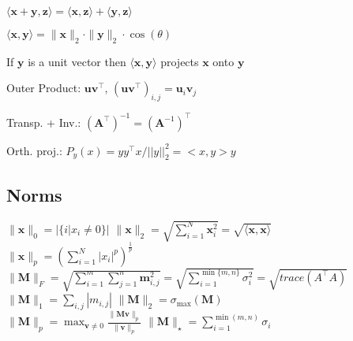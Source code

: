 \begin{compactdesc}
\begin{inparaitem}
		\item $\langle \mathbf{x} + \mathbf{y}, \mathbf{z} \rangle = \langle \mathbf{x}, \mathbf{z} \rangle + \langle \mathbf{y}, \mathbf{z} \rangle$
		\item $\langle \mathbf{x}, \mathbf{y} \rangle = \|\mathbf{x}\|_2 \cdot \|\mathbf{y}\|_2 \cdot \cos(\theta)$
		\item If $\mathbf{y}$ is a unit vector then $\langle \mathbf{x}, \mathbf{y} \rangle$ projects $\mathbf{x}$ onto $\mathbf{y}$
	\end{inparaitem}
	\item[Outer Product:] $\mathbf{u} \mathbf{v}^\top$, $(\mathbf{u} \mathbf{v}^\top)_{i, j} = \mathbf{u}_i \mathbf{v}_j$
	\item[Transp. + Inv.:] $(\mathbf{A}^\top)^{-1} = (\mathbf{A}^{-1})^\top$
	\item[Orth. proj.:] $P_y(x)=y y^\top x / ||y||^2_2 = <x,y>y$
\end{compactdesc}

\subsection*{Norms}
$\|\mathbf{x}\|_0 = |\{i | x_i \neq 0\}|$ \qquad $\|\mathbf{x}\|_2 = \sqrt{\sum_{i=1}^{N} \mathbf{x}_i^2} = \sqrt{\langle \mathbf{x}, \mathbf{x} \rangle}$\\
$\|\mathbf{x}\|_p = \left( \sum_{i=1}^{N} |x_i|^p \right)^{\frac{1}{p}}$\\
$\|\mathbf{M}\|_F =\allowbreak \sqrt{\sum_{i=1}^{m} \sum_{j=1}^{n}\mathbf{m}_{i,j}^2} =\allowbreak \sqrt{\sum_{i=1}^{\min\{m, n\}} \sigma_i^2} = \sqrt{trace(A^\top A)}$\\
$\|\mathbf{M}\|_1 = \sum_{i,j} | m_{i,j}|$ \qquad $\|\mathbf{M}\|_2 = \sigma_{\text{max}}(\mathbf{M})$\\
$\|\mathbf{M}\|_p = \max_{\mathbf{v} \neq 0} \frac{\|\mathbf{M}\mathbf{v}\|_p}{\|\mathbf{v}\|_p}$ \qquad $\|\mathbf{M}\|_\star = \sum_{i=1}^{\min(m, n)} \sigma_i$

